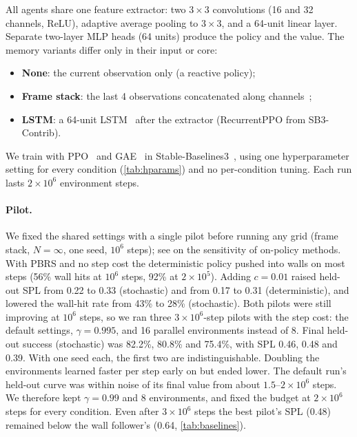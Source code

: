 \documentclass[11pt]{article}
\begin{document}
All agents share one feature extractor: two $3\times3$ convolutions (16 and 32
channels, ReLU), adaptive average pooling to $3\times3$, and a 64-unit linear
layer. Separate two-layer MLP heads (64 units) produce the policy and the
value. The memory variants differ only in their input or core:
\begin{itemize}[leftmargin=*,itemsep=1pt]
  \item \textbf{None}: the current observation only (a reactive policy);
  \item \textbf{Frame stack}: the last 4 observations concatenated along channels~\citep{mnih2015human};
  \item \textbf{LSTM}: a 64-unit LSTM~\citep{hochreiter1997lstm} after the extractor (RecurrentPPO from SB3-Contrib).
\end{itemize}
We train with PPO~\citep{schulman2017ppo} and GAE~\citep{schulman2016gae} in
Stable-Baselines3~\citep{raffin2021sb3}, using one hyperparameter setting
for every condition (\cref{tab:hparams}) and no per-condition tuning. Each run
lasts $2\times10^6$ environment steps.
\paragraph{Pilot.} We fixed the shared settings with a single pilot before
running any grid (frame stack, $N=\infty$, one seed, $10^6$ steps); see
\citet{andrychowicz2021matters} on the sensitivity of on-policy methods. With
PBRS and no step cost the deterministic policy pushed into walls on most steps
(56\% wall hits at $10^6$ steps, 92\% at $2\times10^5$). Adding $c=0.01$ raised
held-out SPL from 0.22 to 0.33 (stochastic) and from 0.17 to 0.31
(deterministic), and lowered the wall-hit rate from 43\% to 28\% (stochastic).
Both pilots were still improving at $10^6$ steps, so we ran three
$3\times10^6$-step pilots with the step cost: the default settings,
$\gamma=0.995$, and 16 parallel environments instead of 8. Final held-out
success (stochastic) was 82.2\%, 80.8\% and 75.4\%, with SPL 0.46, 0.48 and
0.39. With one seed each, the first two are indistinguishable. Doubling the
environments learned faster per step early on but ended lower. The default
run's held-out curve was within noise of its final value from about
$1.5$--$2\times10^6$ steps. We therefore kept $\gamma=0.99$ and 8 environments,
and fixed the budget at $2\times10^6$ steps for every condition. Even after
$3\times10^6$ steps the best pilot's SPL (0.48) remained below the wall
follower's (0.64, \cref{tab:baselines}).
\end{document}
